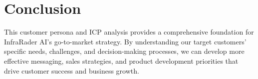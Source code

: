 \documentclass[business]{../templates/infraradar-main}
\begin{document}
\section{Conclusion}

This customer persona and ICP analysis provides a comprehensive foundation for InfraRader AI's go-to-market strategy. By understanding our target customers' specific needs, challenges, and decision-making processes, we can develop more effective messaging, sales strategies, and product development priorities that drive customer success and business growth.
\end{document}
